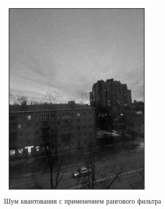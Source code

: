 \documentclass[a4paper,12pt]{article}
\begin{document}
\begin{figure}[H]
\begin{minipage}{0.49\textwidth}
        \centering \includegraphics[width=\textwidth]{results/nlf_pois_4.png}
        \caption{Шум квантования с применением рангового фильтра}
    \end{minipage}
\end{figure}
\end{document}
